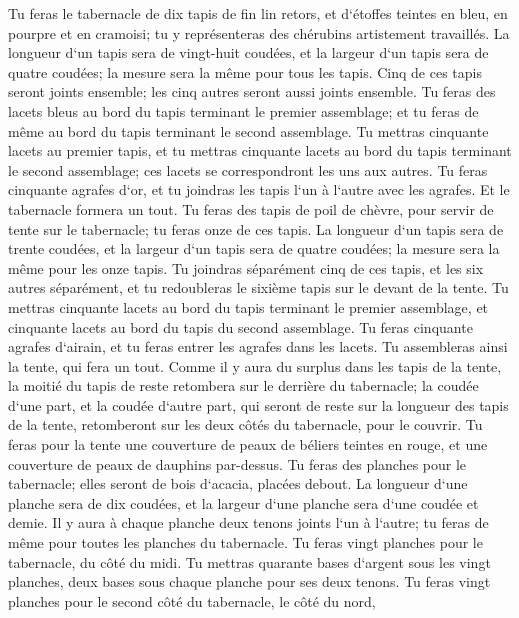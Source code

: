 \verse Tu feras le tabernacle de dix tapis de fin lin retors, et d`étoffes teintes en bleu, en pourpre et en cramoisi; tu y représenteras des chérubins artistement travaillés. 
\verse La longueur d`un tapis sera de vingt-huit coudées, et la largeur d`un tapis sera de quatre coudées; la mesure sera la même pour tous les tapis. 
\verse Cinq de ces tapis seront joints ensemble; les cinq autres seront aussi joints ensemble. 
\verse Tu feras des lacets bleus au bord du tapis terminant le premier assemblage; et tu feras de même au bord du tapis terminant le second assemblage. 
\verse Tu mettras cinquante lacets au premier tapis, et tu mettras cinquante lacets au bord du tapis terminant le second assemblage; ces lacets se correspondront les uns aux autres. 
\verse Tu feras cinquante agrafes d`or, et tu joindras les tapis l`un à l`autre avec les agrafes. Et le tabernacle formera un tout. 
\verse Tu feras des tapis de poil de chèvre, pour servir de tente sur le tabernacle; tu feras onze de ces tapis. 
\verse La longueur d`un tapis sera de trente coudées, et la largeur d`un tapis sera de quatre coudées; la mesure sera la même pour les onze tapis. 
\verse Tu joindras séparément cinq de ces tapis, et les six autres séparément, et tu redoubleras le sixième tapis sur le devant de la tente. 
\verse Tu mettras cinquante lacets au bord du tapis terminant le premier assemblage, et cinquante lacets au bord du tapis du second assemblage. 
\verse Tu feras cinquante agrafes d`airain, et tu feras entrer les agrafes dans les lacets. Tu assembleras ainsi la tente, qui fera un tout. 
\verse Comme il y aura du surplus dans les tapis de la tente, la moitié du tapis de reste retombera sur le derrière du tabernacle; 
\verse la coudée d`une part, et la coudée d`autre part, qui seront de reste sur la longueur des tapis de la tente, retomberont sur les deux côtés du tabernacle, pour le couvrir. 
\verse Tu feras pour la tente une couverture de peaux de béliers teintes en rouge, et une couverture de peaux de dauphins par-dessus. 
\verse Tu feras des planches pour le tabernacle; elles seront de bois d`acacia, placées debout. 
\verse La longueur d`une planche sera de dix coudées, et la largeur d`une planche sera d`une coudée et demie. 
\verse Il y aura à chaque planche deux tenons joints l`un à l`autre; tu feras de même pour toutes les planches du tabernacle. 
\verse Tu feras vingt planches pour le tabernacle, du côté du midi. 
\verse Tu mettras quarante bases d`argent sous les vingt planches, deux bases sous chaque planche pour ses deux tenons. 
\verse Tu feras vingt planches pour le second côté du tabernacle, le côté du nord, 
